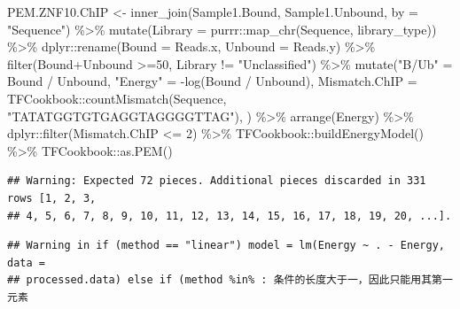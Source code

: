 \documentclass[
]{article}
\newenvironment{Shaded}{\begin{snugshade}}{\end{snugshade}}
\newcommand{\AttributeTok}[1]{\textcolor[rgb]{0.77,0.63,0.00}{#1}}
\newcommand{\DecValTok}[1]{\textcolor[rgb]{0.00,0.00,0.81}{#1}}
\newcommand{\FunctionTok}[1]{\textcolor[rgb]{0.00,0.00,0.00}{#1}}
\newcommand{\NormalTok}[1]{#1}
\newcommand{\OtherTok}[1]{\textcolor[rgb]{0.56,0.35,0.01}{#1}}
\newcommand{\SpecialCharTok}[1]{\textcolor[rgb]{0.00,0.00,0.00}{#1}}
\newcommand{\StringTok}[1]{\textcolor[rgb]{0.31,0.60,0.02}{#1}}
\begin{document}
\begin{Shaded}
\begin{Highlighting}[]
\NormalTok{PEM.ZNF10.ChIP }\OtherTok{\textless{}{-}}
  \FunctionTok{inner\_join}\NormalTok{(Sample1.Bound, Sample1.Unbound, }\AttributeTok{by =} \StringTok{"Sequence"}\NormalTok{) }\SpecialCharTok{\%\textgreater{}\%}
  \FunctionTok{mutate}\NormalTok{(}\AttributeTok{Library =}\NormalTok{ purrr}\SpecialCharTok{::}\FunctionTok{map\_chr}\NormalTok{(Sequence, library\_type)) }\SpecialCharTok{\%\textgreater{}\%}
\NormalTok{  dplyr}\SpecialCharTok{::}\FunctionTok{rename}\NormalTok{(}\AttributeTok{Bound =} \StringTok{\textquotesingle{}Reads.x\textquotesingle{}}\NormalTok{, }\AttributeTok{Unbound =} \StringTok{\textquotesingle{}Reads.y\textquotesingle{}}\NormalTok{) }\SpecialCharTok{\%\textgreater{}\%}
  \FunctionTok{filter}\NormalTok{(Bound}\SpecialCharTok{+}\NormalTok{Unbound }\SpecialCharTok{\textgreater{}=}\DecValTok{50}\NormalTok{, Library }\SpecialCharTok{!=} \StringTok{"Unclassified"}\NormalTok{) }\SpecialCharTok{\%\textgreater{}\%}
  \FunctionTok{mutate}\NormalTok{(}\StringTok{"B/Ub"} \OtherTok{=}\NormalTok{ Bound }\SpecialCharTok{/}\NormalTok{ Unbound,}
         \StringTok{"Energy"} \OtherTok{=} \SpecialCharTok{{-}}\FunctionTok{log}\NormalTok{(Bound }\SpecialCharTok{/}\NormalTok{ Unbound),}
         \AttributeTok{Mismatch.ChIP =}\NormalTok{ TFCookbook}\SpecialCharTok{::}\FunctionTok{countMismatch}\NormalTok{(Sequence, }\StringTok{"TATATGGTGTGAGGTAGGGGTTAG"}\NormalTok{),}
\NormalTok{         ) }\SpecialCharTok{\%\textgreater{}\%}
  \FunctionTok{arrange}\NormalTok{(}\StringTok{\textasciigrave{}}\AttributeTok{Energy}\StringTok{\textasciigrave{}}\NormalTok{) }\SpecialCharTok{\%\textgreater{}\%}
\NormalTok{  dplyr}\SpecialCharTok{::}\FunctionTok{filter}\NormalTok{(Mismatch.ChIP }\SpecialCharTok{\textless{}=} \DecValTok{2}\NormalTok{) }\SpecialCharTok{\%\textgreater{}\%}
\NormalTok{  TFCookbook}\SpecialCharTok{::}\FunctionTok{buildEnergyModel}\NormalTok{() }\SpecialCharTok{\%\textgreater{}\%}
\NormalTok{  TFCookbook}\SpecialCharTok{::}\FunctionTok{as.PEM}\NormalTok{()}
\end{Highlighting}
\end{Shaded}

\begin{verbatim}
## Warning: Expected 72 pieces. Additional pieces discarded in 331 rows [1, 2, 3,
## 4, 5, 6, 7, 8, 9, 10, 11, 12, 13, 14, 15, 16, 17, 18, 19, 20, ...].
\end{verbatim}

\begin{verbatim}
## Warning in if (method == "linear") model = lm(Energy ~ . - Energy, data =
## processed.data) else if (method %in% : 条件的长度大于一，因此只能用其第一元素
\end{verbatim}
\end{document}
